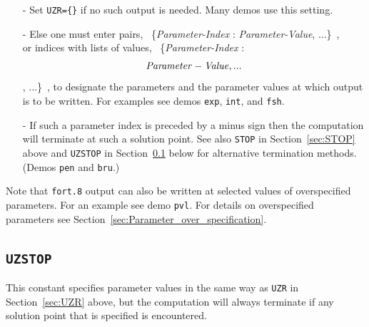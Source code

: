 \documentclass[12pt]{report}
\begin{document}
\begin{itemize}
\item[-]
 Set {\tt UZR=\{\}} if no such output is needed. Many demos use this setting.
\item[-]
 Else one must enter pairs,
            ~\{{\it Parameter-Index} : {\it Parameter-Value}, ...\}~,\\
 or indices with lists of values,
            ~\{{\it Parameter-Index} : \[{\it Parameter-Value}, ...\], ...\}~,
 to designate the parameters and the parameter
 values at which output is to be written.
 For examples see demos {\tt exp}, {\tt int}, and {\tt fsh}.
\item[-]
 If such a parameter index is preceded by a minus sign then the computation will
 terminate at such a solution point. See also \texttt{STOP} in
 Section~\ref{sec:STOP} above and \texttt{UZSTOP} in
 Section~\ref{sec:UZSTOP} below for alternative termination methods.
 (Demos {\tt pen} and {\tt bru}.)
\end{itemize}

Note that {\tt fort.8} output can also be written at selected values of 
overspecified parameters. For an example see demo {\tt pvl}.
For details on overspecified parameters see 
Section~\ref{sec:Parameter_over_specification}.

\subsection{\texttt{UZSTOP}} \label{sec:UZSTOP}
 This constant specifies parameter values in the same way as
 \texttt{UZR} in Section~\ref{sec:UZR} above, but the computation
 will always terminate if any solution point that is specified is
 encountered.

\end{document}
